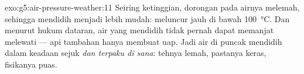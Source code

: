 \begin{solution}{exo:g5:air-pressure-weather:11}
Seiring ketinggian, dorongan  pada airnya melemah, sehingga
mendidih menjadi lebih mudah:  meluncur jauh di bawah
\qty{100}{\celsius}. Dan menurut hukum dataran, air yang mendidih
tidak pernah dapat memanjat melewati  --- api tambahan
hanya membuat uap. Jadi air di puncak mendidih dalam keadaan sejuk
\emph{dan terpaku di sana}: tehnya lemah, pastanya keras, fisikanya
puas.
\end{solution}
